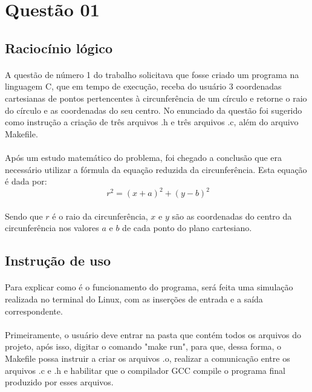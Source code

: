 \documentclass[a4paper, 12pt]{article}
\begin{document}
\section{Quest\~ao 01}
	\subsection{Racioc\'inio l\'ogico}
    	\paragraph{}	A quest\~ao de n\'umero 1 do trabalho solicitava que fosse criado um programa na linguagem C, que em tempo de execu\c{c}\~ao, receba do usu\'ario 3 coordenadas cartesianas de pontos pertencentes \`a circunfer\^encia de um c\'irculo e retorne o raio do c\'irculo e as coordenadas do seu centro. No enunciado da quest\~ao foi sugerido como instrução a cria\c{c}\~ao de tr\^es arquivos .h e tr\^es arquivos .c, al\'em do arquivo Makefile.
        \paragraph{}	Ap\'os um estudo matem\'atico do problema, foi chegado a conclus\~ao que era necess\'ario utilizar a f\'ormula da equa\c{c}\~ao reduzida da circunfer\^encia. Esta equa\c{c}\~ao \'e dada por:
         $$\ r^{2} = (x+a)^{2} + (y-b)^{2} $$
        \paragraph{}	Sendo que $r$ \'e o raio da circunfer\^encia, $x$ e $y$ s\~ao as coordenadas do centro da circunfer\^encia nos valores $a$ e $b$ de cada ponto do plano cartesiano. 	\subsection{Instru\c{c}\~ao de uso}
   		\paragraph{}	Para explicar como \'e o funcionamento do programa, ser\'a feita uma simula\c{c}\~ao realizada no terminal do Linux, com as inser\c{c}\~oes de entrada e a sa\'ida correspondente.
        \paragraph{}	Primeiramente, o usu\'ario deve entrar na pasta que cont\'em todos os arquivos do projeto, ap\'os isso, digitar o comando "make run", para que, dessa forma, o Makefile possa instruir a criar os arquivos .o, realizar a comunica\c{c}\~ao entre os arquivos .c e .h e habilitar que o compilador GCC compile o programa final produzido por esses arquivos.
\end{document}
